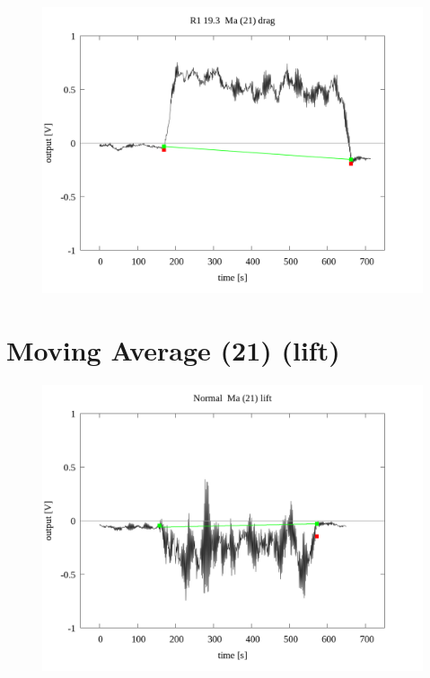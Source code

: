 \documentclass[a4paper]{jsarticle}
\begin{document}
\begin{figure}[htbp]
    \footnotesize
    \begin{center}
        \includegraphics[width=140mm]{../../../../33_result/210806/moving_average/21/drag/03/R1_19.3_ma(21)_drag_03.png}
    \end{center}
\end{figure}

\section{Moving Average (21) (lift)}

\begin{figure}[htbp]
    \footnotesize
    \begin{center}
        \includegraphics[width=140mm]{../../../../33_result/210806/moving_average/21/lift/03/Normal_ma(21)_lift_03.png}
    \end{center}
\end{figure}
\end{document}
